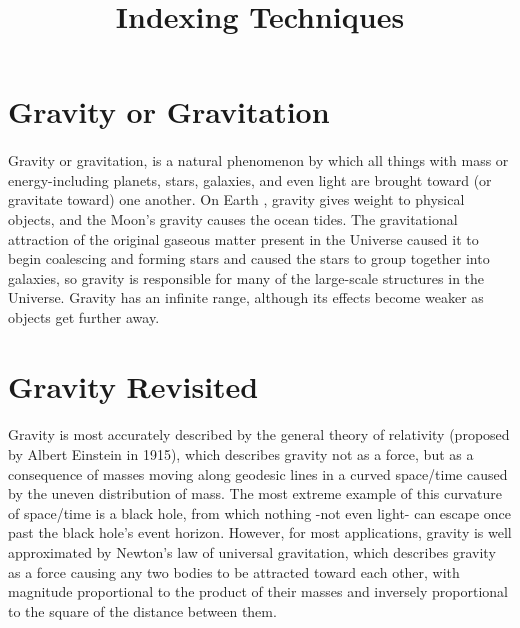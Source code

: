 \documentclass{article}
\title{\Huge\bf Indexing Techniques}
\date{}
\begin{document}
	\maketitle
	\tableofcontents	
	
	\section{Gravity or Gravitation}
	\paragraph{} 
	Gravity or gravitation, is a natural phenomenon by which all things with mass or energy-including planets, stars, galaxies, and even light are brought toward (or gravitate toward) one another. On Earth , gravity gives weight to physical objects, and the Moon's gravity causes the ocean tides. The gravitational attraction of the original gaseous matter present in the Universe caused it to begin coalescing and forming stars and caused the stars to group together into galaxies, so gravity is responsible for many of the large-scale structures in the Universe. Gravity has an infinite range, although its effects become weaker as objects get further away.
	
	
	\pagebreak	
	
	\section{Gravity Revisited}
	\paragraph{} 
	Gravity  is most accurately described by the general theory of relativity   (proposed by Albert Einstein in 1915), which describes gravity not as a force, but as a consequence of masses moving along geodesic lines in a curved space/time caused by the uneven distribution of mass. The most extreme example of this curvature of space/time is a black hole, from which nothing -not even light- can escape once past the black hole's event horizon. However, for most applications, gravity is well approximated by Newton's law of universal  gravitation, which describes gravity as a force causing any two bodies to be attracted toward each other, with magnitude proportional to the product of their masses and inversely proportional to the square of the distance between them. 
	
\end{document}
